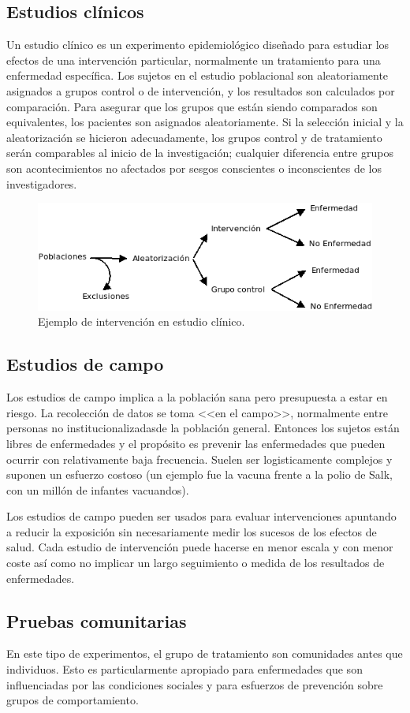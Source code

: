 \subsection{Estudios clínicos}
Un estudio clínico es un experimento epidemiológico diseñado para estudiar los efectos de una intervención particular, normalmente un tratamiento para una enfermedad específica. Los sujetos en el estudio poblacional son aleatoriamente asignados a grupos control o de intervención, y los resultados son calculados por comparación. Para asegurar que los grupos que están siendo comparados son equivalentes, los pacientes son asignados aleatoriamente. Si la selección inicial y la aleatorización se hicieron adecuadamente, los grupos control y de tratamiento serán comparables al inicio de la investigación; cualquier diferencia entre grupos son acontecimientos no afectados por sesgos conscientes o inconscientes de los investigadores.
\begin{figure}[H]
	\centering
	\includegraphics[width=0.5\columnwidth]{A.imagenes/ACV-EPI-EstudioClinico}
	\caption{Ejemplo de intervención en estudio clínico.}
\end{figure}
\subsection{Estudios de campo}
Los estudios de campo implica a la población sana pero presupuesta a estar en riesgo. La recolección de datos se toma <<en el campo>>, normalmente entre personas no institucionalizadasde la población general. Entonces los sujetos están libres de enfermedades y el propósito es prevenir las enfermedades que pueden ocurrir con relativamente baja frecuencia. Suelen ser logisticamente complejos y suponen un esfuerzo costoso (un ejemplo fue la vacuna frente a la polio de Salk, con un millón de infantes vacuandos).

Los estudios de campo pueden ser usados para evaluar intervenciones apuntando a reducir la exposición sin necesariamente medir los sucesos de los efectos de salud. Cada estudio de intervención puede hacerse en menor escala y con menor coste así como no implicar un largo seguimiento o medida de los resultados de enfermedades.
\subsection{Pruebas comunitarias}
En este tipo de experimentos, el grupo de tratamiento son comunidades antes que individuos. Esto es particularmente apropiado para enfermedades que son influenciadas por las condiciones sociales y para esfuerzos de prevención sobre grupos de comportamiento.
